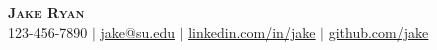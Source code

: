 \documentclass[letterpaper,11pt]{article}
\begin{document}

\begin{center}
    \textbf{\Huge \scshape Jake Ryan} \\ \vspace{1pt}
    \small 123-456-7890 $|$ \href{mailto:x@x.com}{\underline{jake@su.edu}} $|$ 
    \href{https://linkedin.com/in/...}{\underline{linkedin.com/in/jake}} $|$
    \href{https://github.com/...}{\underline{github.com/jake}}
\end{center}
\end{document}

